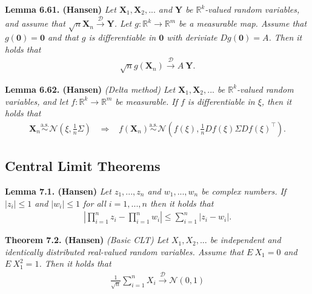 \documentclass[a4paper,12pt,openany]{book}
\begin{document}
\textbf{Lemma 6.61. (Hansen)} \emph{Let \(\mathbf{X}_1,\mathbf{X}_2,...\) and \(\mathbf{Y}\) be \(\mathbb{R}^k\)-valued random variables, and assume that \(\sqrt{n}\mathbf{X}_n\stackrel{\mathcal{D}}{\to} \mathbf{Y}\). Let \(g : \mathbb{R}^k\to \mathbb{R}^m\) be a measurable map. Assume that \(g(\mathbf{0})=\mathbf{0}\) and that \(g\) is differentiable in \(\mathbf{0}\) with deriviate \(Dg(\mathbf{0})=A\). Then it holds that}
\begin{align*}
    \sqrt{n}g(\mathbf{X}_n)\stackrel{\mathcal{D}}{\to} A\ \mathbf{Y}.
\end{align*}

\textbf{Lemma 6.62. (Hansen)} \emph{(Delta method) Let \(\mathbf{X}_1,\mathbf{X}_2,...\) be \(\mathbb{R}^k\)-valued random variables, and let \(f : \mathbb{R}^k\to \mathbb{R}^m\) be measurable. If \(f\) is differentiable in \(\xi\), then it holds that}
\begin{align*}
    \mathbf{X}_n\stackrel{\text{a.s.}}{\sim} \mathcal{N}\left(\xi,\frac{1}{n}\Sigma\right)\hspace{10pt}\Rightarrow\hspace{10pt} f(\mathbf{X}_n)\stackrel{\text{a.s.}}{\sim} \mathcal{N}\left(f(\xi),\frac{1}{n}Df(\xi)\Sigma Df(\xi)^\top\right).
\end{align*}

\hypertarget{central-limit-theorems}{%
\subsection{Central Limit Theorems}\label{central-limit-theorems}}

\textbf{Lemma 7.1. (Hansen)} \emph{Let \(z_1,...,z_n\) and \(w_1,...,w_n\) be complex numbers. If \(\vert z_i\vert \le 1\) and \(\vert w_i\vert\le 1\) for all \(i=1,...,n\) then it holds that}
\begin{align*}
    \left\vert\prod_{i=1}^n z_i-\prod_{i=1}^n w_i\right\vert\le \sum_{i=1}^n \vert z_i-w_i\vert.\tag{7.1 }
\end{align*}

\textbf{Theorem 7.2. (Hansen)} \emph{(Basic CLT) Let \(X_1,X_2,...\) be independent and identically distributed real-valued random variables. Assume that \(E\ X_1=0\) and \(E\ X_1^2=1\). Then it holds that}
\begin{align*}
    \frac{1}{\sqrt{n}}\sum_{i=1}^nX_i\stackrel{\mathcal{D}}{\to} \mathcal{N}(0,1)\tag{7.3}
\end{align*}
\end{document}
